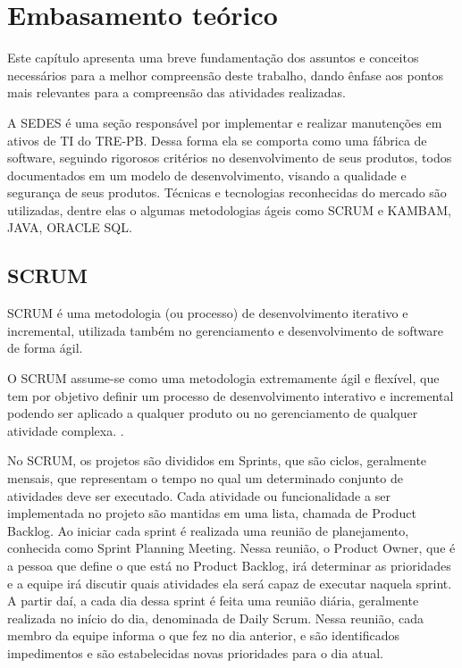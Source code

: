 
\chapter{Embasamento teórico }
\label{chap:embasamentoTeorico}

Este capítulo apresenta uma breve fundamentação dos assuntos e conceitos necessários para a melhor compreensão deste trabalho, dando ênfase aos pontos mais relevantes para a compreensão das atividades realizadas.

A SEDES é uma seção responsável por implementar e realizar manutenções em ativos de TI do TRE-PB. Dessa forma ela se comporta como uma fábrica de software, seguindo rigorosos critérios no desenvolvimento de seus produtos, todos documentados em um modelo de desenvolvimento, visando a qualidade e segurança de seus produtos. Técnicas e tecnologias reconhecidas do mercado são utilizadas, dentre elas o algumas metodologias ágeis como SCRUM e KAMBAM, JAVA, ORACLE SQL.

\section{SCRUM}
\label{sec:embasamentoTeoricoSCRUM}

SCRUM é uma metodologia (ou processo) de desenvolvimento iterativo e incremental, utilizada também no gerenciamento e desenvolvimento de software de forma ágil.

\begin{citacao}
    O SCRUM assume-se como uma metodologia extremamente ágil e flexível, que tem por objetivo definir um processo de desenvolvimento interativo e incremental podendo ser aplicado a qualquer produto ou no gerenciamento de qualquer atividade complexa. \cite{Bissi2007}.
\end{citacao}

No SCRUM, os projetos são divididos em Sprints, que são ciclos, geralmente mensais, que representam o tempo no qual um determinado conjunto de atividades deve ser executado. Cada atividade ou funcionalidade a ser implementada no projeto são mantidas em uma lista, chamada de Product Backlog. Ao iniciar cada sprint é realizada uma reunião de planejamento, conhecida como Sprint Planning Meeting. Nessa reunião, o Product Owner, que é a pessoa que define o que está no Product Backlog, irá determinar as prioridades e a equipe irá discutir quais atividades ela será capaz de executar naquela sprint. A partir daí, a cada dia dessa sprint é feita uma reunião diária, geralmente realizada no início do dia, denominada de Daily Scrum.  Nessa reunião, cada membro da equipe informa o que fez no dia anterior, e são identificados impedimentos e são estabelecidas novas prioridades para o dia atual.

